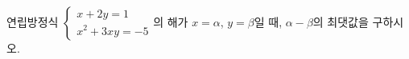 연립방정식 $\begin{cases} x+2y=1 \\ x^2+3xy=-5 \end{cases}$의 해가 $x=\alpha$, $y=\beta$일 때, $\alpha-\beta$의 최댓값을 구하시오.
